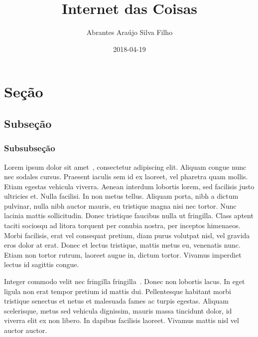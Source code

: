 \documentclass[pdftex, brazil, 12pt, twoside]{article}
\begin{document}
\title{Internet das Coisas}
\author{Abrantes Araújo Silva Filho}
\date{2018-04-19}
\maketitle
\tableofcontents


\section{Seção}
\label{etiqueta}


\subsection{Subseção}
\label{subetiqueta}


\subsubsection{Subsubseção}
\label{subsubetiqueta}

Lorem ipsum dolor sit amet~\citep{9788537810415}, consectetur adipiscing elit. Aliquam congue nunc nec sodales cursus. Praesent iaculis sem id ex laoreet, vel pharetra quam mollis. Etiam egestas vehicula viverra. Aenean interdum lobortis lorem, sed facilisis justo ultricies et. Nulla facilisi. In non metus tellus. Aliquam porta, nibh a dictum pulvinar, nulla nibh auctor mauris, eu tristique magna nisi nec tortor. Nunc lacinia mattis sollicitudin. Donec tristique faucibus nulla ut fringilla. Class aptent taciti sociosqu ad litora torquent per conubia nostra, per inceptos himenaeos. Morbi facilisis, erat vel consequat pretium, diam purus volutpat nisl, vel gravida eros dolor at erat. Donec et lectus tristique, mattis metus eu, venenatis nunc. Etiam non tortor rutrum, laoreet augue in, dictum tortor. Vivamus imperdiet lectus id sagittis congue.

Integer commodo velit nec fringilla fringilla~\citep{9780443074448}. Donec non lobortis lacus. In eget ligula non erat tempor pretium id mattis dui. Pellentesque habitant morbi tristique senectus et netus et malesuada fames ac turpis egestas. Aliquam scelerisque, metus sed vehicula dignissim, mauris massa tincidunt dolor, id viverra elit ex non libero. In dapibus facilisis laoreet. Vivamus mattis nisl vel auctor auctor.
\end{document}
